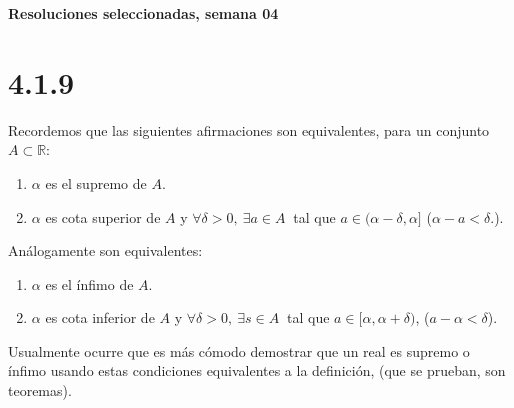\documentclass[10pt,a4paper]{article}
\begin{document}
\vspace{0,3cm}

\begin{center}
{\bf \Large Resoluciones seleccionadas, semana 04}
\end{center}


\vspace{0,3cm}

\section*{4.1.9}\emph{}%

\noindent
Recordemos que las siguientes afirmaciones son equivalentes,
para un conjunto $A \subset \mathbb{R}$:

\begin{enumerate}[label=S-\Roman*)]
\item $\alpha$ es el supremo de $A$.
\item $\alpha$ es cota superior de $A$ y
  $\forall \delta > 0, \: \exists a \in A \:$ tal que
  $ a \in (\alpha -\delta, \alpha]$ ($ \alpha - a < \delta $.).
\end{enumerate}

\noindent
An\'alogamente son equivalentes:

\begin{enumerate}[label=I-\Roman*)]
\item $\alpha$ es el \'infimo de $A$.
\item $\alpha$ es cota inferior de $A$ y
  $\forall \delta > 0, \: \exists s \in A \:$ tal que
  $ a \in [\alpha, \alpha + \delta)$, ($a - \alpha < \delta$).
\end{enumerate}

\noindent
Usualmente ocurre que es m\'as c\'omodo demostrar que un real es supremo o
\'infimo usando estas condiciones equivalentes a la definici\'on,
(que se prueban, son teoremas).
\end{document}
